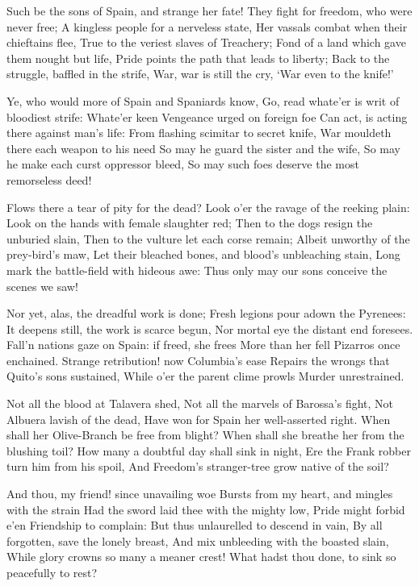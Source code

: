 \documentclass[10pt,twocolumn]{book}
\begin{document}
   Such be the sons of Spain, and strange her fate!
   They fight for freedom, who were never free;
   A kingless people for a nerveless state,
   Her vassals combat when their chieftains flee,
   True to the veriest slaves of Treachery;
   Fond of a land which gave them nought but life,
   Pride points the path that leads to liberty;
   Back to the struggle, baffled in the strife,
War, war is still the cry, `War even to the knife!'


   Ye, who would more of Spain and Spaniards know,
   Go, read whate'er is writ of bloodiest strife:
   Whate'er keen Vengeance urged on foreign foe
   Can act, is acting there against man's life:
   From flashing scimitar to secret knife,
   War mouldeth there each weapon to his need\textemdash
   So may he guard the sister and the wife,
   So may he make each curst oppressor bleed,
So may such foes deserve the most remorseless deed!


   Flows there a tear of pity for the dead?
   Look o'er the ravage of the reeking plain:
   Look on the hands with female slaughter red;
   Then to the dogs resign the unburied slain,
   Then to the vulture let each corse remain;
   Albeit unworthy of the prey-bird's maw,
   Let their bleached bones, and blood's unbleaching stain,
   Long mark the battle-field with hideous awe:
Thus only may our sons conceive the scenes we saw!


   Nor yet, alas, the dreadful work is done;
   Fresh legions pour adown the Pyrenees:
   It deepens still, the work is scarce begun,
   Nor mortal eye the distant end foresees.
   Fall'n nations gaze on Spain:  if freed, she frees
   More than her fell Pizarros once enchained.
   Strange retribution! now Columbia's ease
   Repairs the wrongs that Quito's sons sustained,
While o'er the parent clime prowls Murder unrestrained.


   Not all the blood at Talavera shed,
   Not all the marvels of Barossa's fight,
   Not Albuera lavish of the dead,
   Have won for Spain her well-asserted right.
   When shall her Olive-Branch be free from blight?
   When shall she breathe her from the blushing toil?
   How many a doubtful day shall sink in night,
   Ere the Frank robber turn him from his spoil,
And Freedom's stranger-tree grow native of the soil?


   And thou, my friend! since unavailing woe
   Bursts from my heart, and mingles with the strain\textemdash
   Had the sword laid thee with the mighty low,
   Pride might forbid e'en Friendship to complain:
   But thus unlaurelled to descend in vain,
   By all forgotten, save the lonely breast,
   And mix unbleeding with the boasted slain,
   While glory crowns so many a meaner crest!
What hadst thou done, to sink so peacefully to rest?
\end{document}
